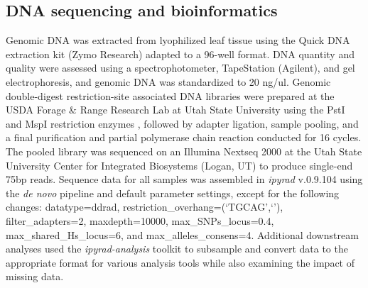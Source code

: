 \documentclass[11pt]{article}
\begin{document}
\subsection{DNA sequencing and bioinformatics}
Genomic DNA was extracted from lyophilized leaf tissue using the Quick DNA
extraction kit (Zymo Research) adapted to a 96-well format. 
DNA quantity and quality were assessed using a spectrophotometer, TapeStation 
(Agilent), and gel electrophoresis, and genomic DNA was standardized to 20 ng/ul. 
% 
Genomic double-digest restriction-site associated DNA \citep[ddRAD-seq;][]{peterson_double_2012}
libraries were prepared at the USDA Forage \& Range Research Lab at 
Utah State University using the PstI and MspI restriction enzymes
\citep{poland_development_2012},
followed by adapter ligation, sample pooling, and a final purification
and partial polymerase chain reaction conducted for 16 cycles. 
% 
The pooled library was sequenced on an Illumina Nextseq 2000 at the Utah State 
University Center for Integrated Biosystems (Logan, UT) to produce single-end
75bp reads. 
% 
Sequence data for all samples was assembled in \emph{ipyrad} 
v.0.9.104 \citep{eaton_ipyrad_2020} using the \emph{de novo} 
pipeline and default parameter settings, except for the following
changes: datatype=ddrad, restriction\_overhang=(`TGCAG',`'),
filter\_adapters=2, maxdepth=10000, max\_SNPs\_locus=0.4,
max\_shared\_Hs\_locus=6, and max\_alleles\_consens=4. 
% 
Additional downstream analyses 
used the \emph{ipyrad-analysis} toolkit to subsample and convert data to the
appropriate format for various analysis tools while also examining the impact of
missing data.
\end{document}
